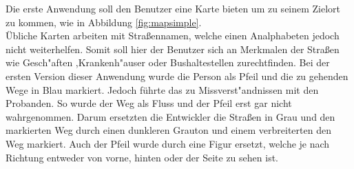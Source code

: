 Die erste Anwendung soll den Benutzer eine Karte bieten um zu seinem Zielort zu kommen, wie in Abbildung \ref{fig:mapsimple}.\\
Übliche Karten arbeiten mit Straßennamen, welche einen Analphabeten jedoch nicht weiterhelfen. Somit soll hier der Benutzer sich an Merkmalen der Straßen wie Gesch"aften ,Krankenh"auser oder Bushaltestellen zurechtfinden.
Bei der ersten Version dieser Anwendung wurde die Person als Pfeil und die zu gehenden Wege in Blau markiert. Jedoch führte das zu Missverst"andnissen mit den Probanden. So wurde der Weg als Fluss und der Pfeil erst gar nicht wahrgenommen. Darum ersetzten die Entwickler die Straßen in Grau und den markierten Weg durch einen dunkleren Grauton und einem verbreiterten den Weg markiert.
Auch der Pfeil wurde durch eine Figur ersetzt, welche je nach Richtung entweder von vorne, hinten oder der Seite zu sehen ist.

